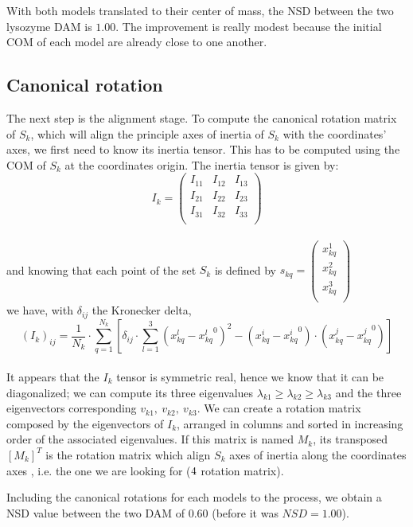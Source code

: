 \documentclass[a4paper, 11pt]{report}
\begin{document}
With both models translated to their center of mass, the NSD between 
the two lysozyme DAM is $1.00$. 
The improvement is really modest because the initial COM of each model 
are already close to one another.

\subsection{Canonical rotation}

The next step is the alignment stage. 
To compute the canonical rotation matrix of $S_{k}$, which will align 
the principle axes of inertia of $S_{k}$ with the coordinates' axes, 
we first need to know its inertia tensor. 
This has to be computed using the COM of $S_{k}$ at the coordinates 
origin. 
The inertia tensor is given by:
\[
I_{k}=
\begin{pmatrix}
 I_{11} & I_{12} & I_{13} \\
 I_{21} & I_{22} & I_{23} \\
 I_{31} & I_{32} & I_{33} \\
\end{pmatrix}
\]\\
and knowing that each point of the set $S_{k}$ is defined by
$
s_{kq}=
\begin{pmatrix}
 x_{kq}^1 \\
 x_{kq}^2 \\
 x_{kq}^3 \\
\end{pmatrix}
$\\
we have, with $\delta_{ij}$ the Kronecker delta,
\[
(I_{k})_{ij} = \frac{1}{N_{k}} \cdot \sum\limits_{q=1}^{N_{k}} 
[\delta_{ij} \cdot \sum\limits_{l=1}^3 
 (x_{kq}^l - {x_{kq}^l}^0)^2 -  (x_{kq}^i - {x_{kq}^i}^0) 
 \cdot (x_{kq}^j - {x_{kq}^j}^0)]
\]\\
It appears that the $I_{k}$ tensor is symmetric real, hence we know 
that it can be diagonalized; we can compute its three eigenvalues 
$\lambda_{k1} \geq \lambda_{k2} \geq \lambda_{k3}$ and the three 
eigenvectors corresponding $v_{k1},\ v_{k2},\ v_{k3}$. 
We can create a rotation matrix composed by the eigenvectors of 
$I_{k}$, arranged in columns and sorted in increasing order of the 
associated eigenvalues. 
If this matrix is named $M_{k}$, its transposed $[M_{k}]^T$ is the 
rotation matrix which align $S_{k}$ axes of inertia along the 
coordinates axes \cite{supcomb}, i.e. the one we are looking for 
($4 \time 4$ rotation matrix).

Including the canonical rotations for each models to the process, we 
obtain a NSD value between the two DAM of $0.60$ (before it was 
$NSD = 1.00$).
\end{document}
